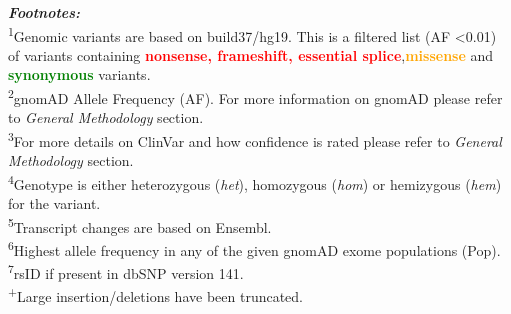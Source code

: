 \textbf{\textit{Footnotes:}}
\\
\textsuperscript{1}Genomic variants are based on build37/hg19. This is a filtered list (AF \textless 0.01) of variants containing \textcolor{red}{\textbf{nonsense, frameshift, essential splice}},\textcolor{Orange}{\textbf{missense}} and \textcolor{Green}{\textbf{synonymous}} variants.
\\
\textsuperscript{2}gnomAD Allele Frequency (AF). For more information on gnomAD please refer to \textit{General Methodology} section.
\\
\textsuperscript{3}For more details on ClinVar and how confidence is rated please refer to \textit{General Methodology} section.
\\
\textsuperscript{4}Genotype is either heterozygous (\textit{het}), homozygous (\textit{hom}) or hemizygous (\textit{hem}) for the variant.
\\
\textsuperscript{5}Transcript changes are based on Ensembl.
\\
\textsuperscript{6}Highest allele frequency in any of the given gnomAD exome populations (Pop).
\\
\textsuperscript{7}rsID if present in dbSNP version 141.
\\
\textsuperscript{+}Large insertion/deletions have been truncated.
\newpage

